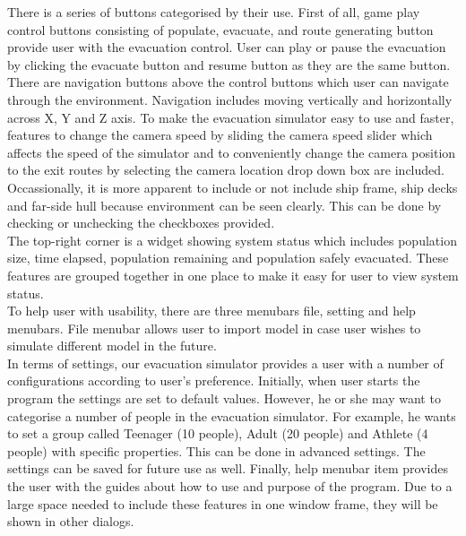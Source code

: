 \documentclass[a4paper,10pt]{article}
\begin{document}
There is a series of buttons categorised by their use. First of all, game play control buttons consisting of populate, evacuate, and 
route generating button provide user with the evacuation control. User can play or pause the evacuation by clicking the evacuate button and resume button 
as they are the same button. There are navigation buttons above the control buttons which user can navigate through the environment. 
Navigation includes moving vertically and horizontally across X, Y and Z axis. To make the evacuation simulator easy to use and faster, 
features to change the camera speed by sliding the camera speed slider which affects the speed of the simulator and to conveniently 
change the camera position to the exit routes by selecting the camera location drop down box are included. Occassionally, it is more apparent to include or not include 
ship frame, ship decks and far-side hull because environment can be seen clearly. This can be done by checking or unchecking the checkboxes provided.
\\

The top-right corner is a widget showing system status which includes population size, time elapsed, population remaining and population safely evacuated.
These features are grouped together in one place to make it easy for user to view system status.
\\

To help user with usability, there are three menubars file, setting and help menubars. File menubar allows user to import 
model in case user wishes to simulate different model in the future.
\\

In terms of settings, our evacuation simulator provides a user with a number of configurations according to user's preference. Initially, when user 
starts the program the settings are set to default values. However, he or she may want to categorise a number of people in the evacuation simulator. For example,
he wants to set a group called Teenager (10 people), Adult (20 people) and Athlete (4 people) with specific properties. This can be done in advanced 
settings. The settings can be saved for future use as well.
Finally, help menubar item provides the user with the guides about how to use and purpose of the program. 
Due to a large space needed to include these features in one window frame, they will be shown in other dialogs.
\end{document}
